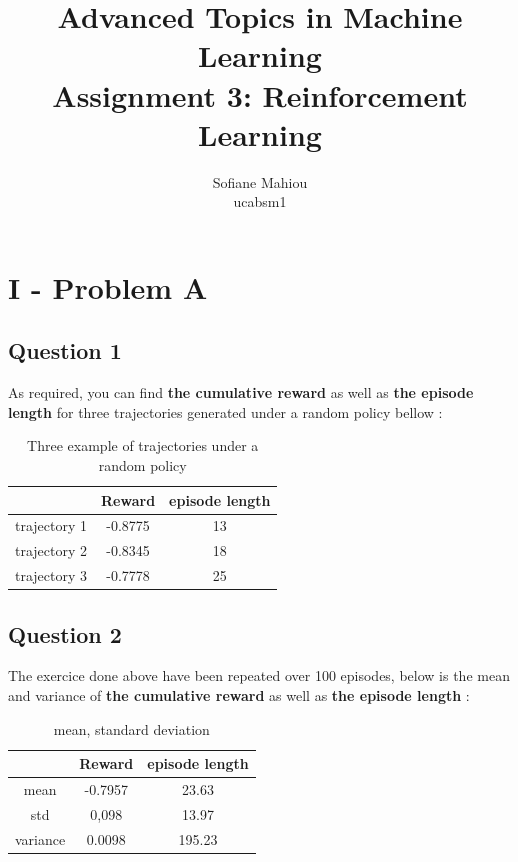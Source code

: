 \documentclass{report}
\title{Advanced Topics in Machine Learning \\
		Assignment 3: Reinforcement Learning}
\author{
		Sofiane Mahiou \\
    ucabsm1
		}
\begin{document}
 
\maketitle{} 
\setlength\parindent{0pt}


\section*{I - Problem A}


\subsection*{Question 1}

As required, you can find \textbf{the cumulative reward} as well as \textbf{the episode length} for  three trajectories generated under a random policy bellow : \\

\begin{table}[H]
\centering
\caption{Three example of trajectories under a random policy}
\label{tabA1}
\begin{tabular}{c|c|c|}
\cline{2-3}
                                   & Reward & episode length \\ \hline
\multicolumn{1}{|c|}{trajectory 1} &     -0.8775   &        13       \\ \hline
\multicolumn{1}{|c|}{trajectory 2} &     -0.8345   &        18       \\ \hline
\multicolumn{1}{|c|}{trajectory 3} &     -0.7778   &        25        \\ \hline
\end{tabular}
\end{table}


\subsection*{Question 2}

The exercice done above have been repeated over 100 episodes, below is the mean and variance of \textbf{the cumulative reward} as well as \textbf{the episode length} : \\

\begin{table}[H]
\centering
\caption{mean, standard deviation}
\label{tabA2}
\begin{tabular}{c|c|c|}
\cline{2-3}
                               & Reward & episode length \\ \hline
\multicolumn{1}{|c|}{mean}     &    -0.7957    &          23.63       \\ \hline
\multicolumn{1}{|c|}{std} &    0,098  &       13.97 \\ \hline
\multicolumn{1}{|c|}{variance} &     0.0098   &      195.23       \\ \hline
\end{tabular}
\end{table}
\end{document}
